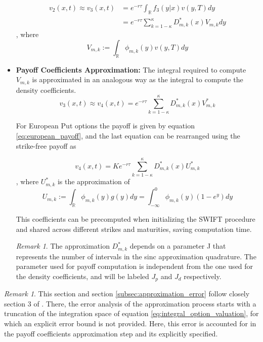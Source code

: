 \documentclass[12,twoside]{mammeTFM}
\theoremstyle{definition}
\theoremstyle{remark}
\newtheorem{remark}[thm]{Remark}
\newcommand{\R}{\ensuremath{\mathbb{R}}}
\begin{document}
\begin{itemize}
\begin{equation}
\end{equation}
\begin{equation}
\begin{aligned}
v_2(x,t) \approx v_3(x,t) & = e^{-r \tau} \int_{\R} f_3(y|x)v(y, T)dy \\
&= e^{-r \tau} \sum_{k = 1 - \kappa}^{\kappa} D_{m,k}^{*}(x)  V_{m,k}dy
\end{aligned}
\end{equation}
, where
\begin{equation}
V_{m,k} := \int_{\R} \phi_{m,k}(y) v(y, T)dy
\end{equation}
\item \textbf{Payoff Coefficients Approximation: }
The integral required to compute $V_{m,k}$ is approximated in an analogous way as the integral to compute the density coefficients.
\begin{equation}
v_3(x,t) \approx v_4(x,t) = e^{-r \tau} \sum_{k = 1 - \kappa}^{\kappa} D_{m,k}^{*}(x) V_{m,k}^{*}
\end{equation}

For European Put options the payoff is given by equation \ref{eq:european_payoff}, and the last equation can be rearranged using the strike-free payoff as

\begin{equation}
v_4(x,t) = K e^{-r \tau} \sum_{k = 1 - \kappa}^{\kappa} D_{m,k}^{*}(x) U_{m,k}^{*}
\end{equation}
, where $U_{m,k}^{*}$ is the approximation of 
\begin{equation} \label{eq:compact_payoffs}
U_{m,k} := \int_{\R} \phi_{m,k}(y)g(y) dy = \int_{-\infty}^{0} \phi_{m,k}(y)(1-e^{y}) dy
\end{equation}

This coefficients can be precomputed when initializing the SWIFT procedure and shared across different strikes and maturities, saving computation time.
\begin{remark}
The approximation $D_{m,k}^{*}$ depends on a parameter J that represents the number of intervals in the sinc approximation quadrature. The parameter used for payoff computation is independent from the one used for the density coefficients, and will be labeled $J_p$ and $J_d$ respectively.
\end{remark}
\end{itemize}

\begin{remark}
This section and section \ref{subsec:approximation_error} follow closely section 3 of \cite{mar17}. There, the error analysis of the approximation process starts with a truncation of the integration space of equation  \ref{eq:integral_option_valuation}, for which an explicit error bound is not provided. Here, this error is accounted for in the payoff coefficients approximation step and its explicitly specified.
\end{remark}
\end{document}

